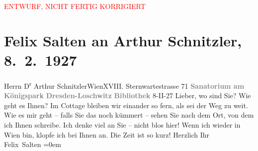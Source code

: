 
\begin{center}
            \textcolor{red}{ENTWURF, NICHT FERTIG KORRIGIERT}
                      \end{center}
            
         \renewcommand{\erwaehnteOrte}{Orte: Dresden, Loschwitz, Sanatorium am Königspark, Sternwartestraße, Wien, Währinger Cottage}
         \renewcommand{\erwaehnteWerke}{}
               \section[Felix Salten an Arthur Schnitzler, 8. 2. 1927]{ Felix Salten an Arthur Schnitzler, 8. 2. 1927}\nopagebreak{}\rehead{ }\begin{ledgroupsized}[t]{13cm}\normalsize\beginnumbering \toendnotes[C]{\smallbreak\pagebreak[2]} 
\pstart{}{\pb}Herrn D\textsuperscript{r} Arthur Schnitzler\pend{}\pstart{}Wien\pend{}\pstart{}XVIII. Sternwartestrasse 71\pend{}{\bigskip}\pstart
           \noindent{}\centering{}{\pb}\textcolor{gray}{\textbf{Sanatorium am Königspark}}\pend
           \pstart
           \noindent{}\centering{}\textcolor{gray}{\textbf{Dresden-Loschwitz}}\pend
           \pstart
           \noindent{}\centering{}\textcolor{gray}{\textbf{Bibliothek}}\pend
           \pstart
           \raggedleft{}{\pb}8-II-27\pend
           \pstart
           Lieber, wo sind Sie? Wie geht es Ihnen? Im Cottage bleiben wir einander so fern, als sei der Weg zu weit.
               Wie es mir geht – falls Sie das noch kümmert – sehen Sie nach dem Ort, von dem ich
               Ihnen schreibe. Ich denke viel an Sie – nicht blos hier! Wenn ich wieder in Wien bin, klopfe ich bei Ihnen an. Die Zeit ist so
               kurz!\pend
           \pstart
           Herzlich Ihr {\\[\baselineskip]}\spacefill\mbox{Felix Salten}\pend
           \leftskip=0em{}
         
         \endnumbering{}\end{ledgroupsized}\begin{anhang}\end{anhang}\newcommand{\dateiname}{L03596}\newcommand{\titel}{Felix Salten an Arthur Schnitzler, 8. 2. 1927}\newcommand{\editorInnen}{Martin Anton Müller und Laura Untner}
      